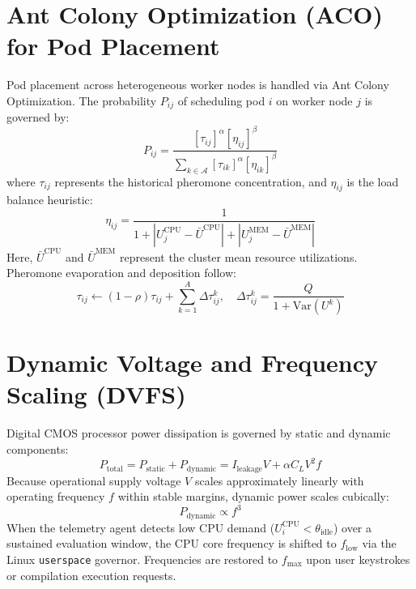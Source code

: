 \documentclass[12pt,a4paper]{report}
\begin{document}
\section{Ant Colony Optimization (ACO) for Pod Placement}
Pod placement across heterogeneous worker nodes is handled via Ant Colony Optimization. The probability $P_{ij}$ of scheduling pod $i$ on worker node $j$ is governed by:
\begin{equation}
    P_{ij} = \frac{[\tau_{ij}]^\alpha [\eta_{ij}]^\beta}{\sum_{k \in \mathcal{A}} [\tau_{ik}]^\alpha [\eta_{ik}]^\beta}
\end{equation}
where $\tau_{ij}$ represents the historical pheromone concentration, and $\eta_{ij}$ is the load balance heuristic:
\begin{equation}
    \eta_{ij} = \frac{1}{1 + |U_j^{\text{CPU}} - \bar{U}^{\text{CPU}}| + |U_j^{\text{MEM}} - \bar{U}^{\text{MEM}}|}
\end{equation}
Here, $\bar{U}^{\text{CPU}}$ and $\bar{U}^{\text{MEM}}$ represent the cluster mean resource utilizations. Pheromone evaporation and deposition follow:
\begin{equation}
    \tau_{ij} \leftarrow (1 - \rho)\tau_{ij} + \sum_{k=1}^A \Delta \tau_{ij}^k, \quad \Delta \tau_{ij}^k = \frac{Q}{1 + \text{Var}(U^k)}
\end{equation}

\section{Dynamic Voltage and Frequency Scaling (DVFS)}
Digital CMOS processor power dissipation is governed by static and dynamic components:
\begin{equation}
    P_{\text{total}} = P_{\text{static}} + P_{\text{dynamic}} = I_{\text{leakage}} V + \alpha C_L V^2 f
\end{equation}
Because operational supply voltage $V$ scales approximately linearly with operating frequency $f$ within stable margins, dynamic power scales cubically:
\begin{equation}
    P_{\text{dynamic}} \propto f^3
\end{equation}
When the telemetry agent detects low CPU demand ($U_i^{\text{CPU}} < \theta_{\text{idle}}$) over a sustained evaluation window, the CPU core frequency is shifted to $f_{\text{low}}$ via the Linux \texttt{userspace} governor. Frequencies are restored to $f_{\max}$ upon user keystrokes or compilation execution requests.

\end{document}
